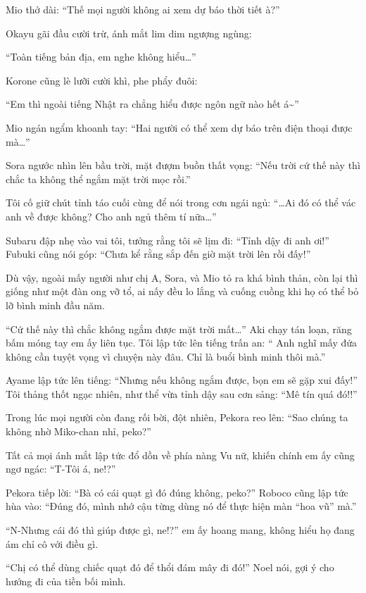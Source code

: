 \documentclass[../main.tex]{subfiles}
\begin{document}
Mio thở dài: ``Thế mọi người không ai xem dự báo thời tiết à?''

Okayu gãi đầu cười trừ, ánh mắt lim dim ngượng ngùng:

``Toàn tiếng bản địa, em nghe không hiểu\dots''

Korone cũng lè lưỡi cười khì, phe phẩy đuôi:

``Em thì ngoài tiếng Nhật ra chẳng hiểu được ngôn ngữ nào hết á\~{}''

Mio ngán ngẩm khoanh tay: ``Hai người có thể xem dự báo trên điện thoại được mà\dots''

Sora ngước nhìn lên bầu trời, mặt đượm buồn thất vọng: ``Nếu trời cứ thế này thì chắc ta không thể ngắm mặt trời mọc rồi.''

Tôi cố giữ chút tỉnh táo cuối cùng để nói trong cơn ngái ngủ: ``\dots Ai đó có thể vác anh về được không? Cho anh ngủ thêm tí nữa\dots''

Subaru đập nhẹ vào vai tôi, tưởng rằng tôi sẽ lịm đi: ``Tỉnh dậy đi anh ơi!'' Fubuki cũng nói góp: ``Chưa kể rằng sắp đến giờ mặt trời lên rồi đấy!''

Dù vậy, ngoài mấy người như chị A, Sora, và Mio tỏ ra khá bình thản, còn lại thì giống như một đàn ong vỡ tổ, ai nấy đều lo lắng và cuống cuồng khi họ có thể bỏ lỡ bình minh đầu năm.

``Cứ thế này thì chắc không ngắm được mặt trời mất\dots'' Aki chạy tán loạn, răng bấm móng tay em ấy liên tục. Tôi lập tức lên tiếng trấn an: `` Anh nghĩ mấy đứa không cần tuyệt vọng vì chuyện này đâu. Chỉ là buổi bình minh thôi mà.''

Ayame lập tức lên tiếng: ``Nhưng nếu không ngắm được, bọn em sẽ gặp xui đấy!'' Tôi thảng thốt ngạc nhiên, như thể vừa tỉnh dậy sau cơn sảng: ``Mê tín quá đó!!''

Trong lúc mọi người còn đang rối bời, đột nhiên, Pekora reo lên: ``Sao chúng ta không nhờ Miko-chan nhỉ, peko?''

Tất cả mọi ánh mắt lập tức đổ dồn về phía nàng Vu nữ, khiến chính em ấy cũng ngơ ngác: ``T-Tôi á, ne!?''

Pekora tiếp lời: ``Bà có cái quạt gì đó đúng không, peko?'' Roboco cũng lập tức hùa vào: ``Đúng đó, mình nhớ cậu từng dùng nó để thực hiện màn ``hoa vũ'' mà.''

``N-Nhưng cái đó thì giúp được gì, ne!?'' em ấy hoang mang, không hiểu họ đang ám chỉ cô với điều gì.

``Chị có thể dùng chiếc quạt đó để thổi đám mây đi đó!'' Noel nói, gợi ý cho hướng đi của tiền bối mình.
\end{document}
